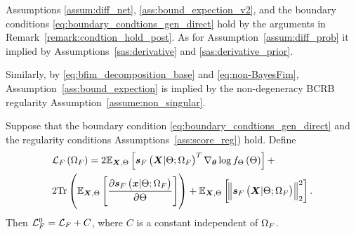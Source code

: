 \begin{remark}\label{remark:fisher_score}
Assumptions  \ref{assum:diff_net}, \ref{ass:bound_expection_v2}, and the boundary conditions  \eqref{eq:boundary_condtions_gen_direct} hold by the arguments %
in Remark~\ref{remark:condtion_hold_post}.  {As for Assumption~\ref{assum:diff_prob} it implied by Assumptions~\ref{sas:derivative} and \ref{sas:derivative_prior}.}

Similarly, by \eqref{eq:bfim_decomposition_base} and \eqref{eq:non-BayesFim}, 
Assumption~\ref{ass:bound_expection} is implied by the non-degeneracy BCRB regularity Assumption~\ref{assume:non_singular}.

\end{remark}
\begin{theorem}\label{thm:liklihood} 
{Suppose that the boundary condition \eqref{eq:boundary_condtions_gen_direct} and the
}
regularity conditions Assumptions~\ref{ass:score_reg}) hold.
{Define}\begin{align}\label{eq:score_match_param_gen_direct}
    &\lossfst\brackets{\paramf}=2\expectation{\lscore{{\X}}{\pr;\paramf}^T\nabla_{\p}\log\probt{\pr}{\pr}}{{\X},\pr} +\\
    &2\trace{\expectation{\frac{\partial \lscore{\x}{\pr;\paramf}}{\partial\pr}}{\X,\pr}}+\expectation{\norm{\lscore{{\X}}{\pr;\paramf}}_2^2}{{\X},\pr}.\nonumber 
\end{align}
{Then ${\mathcal{L}_{F}^{0}}={{\mathcal{L}}_{F}}+C$, where $C$ is a constant independent of $\Omega_{F}$.}
\end{theorem}
